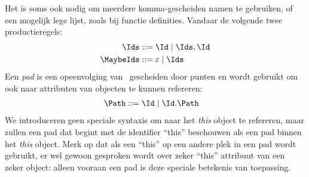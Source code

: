 Het is soms ook nodig om meerdere komma-gescheiden namen te gebruiken, of een mogelijk lege lijst, zoals bij functie definities. Vandaar de volgende twee productieregels:
%
\begin{align*}
  \Ids \GrammarDef \Id \mid \Ids, \Id \\
  \MaybeIds \GrammarDef \varepsilon \mid \Ids
\end{align*}
%
Een \emph{pad} is een opeenvolging van \Ids\ gescheiden door punten en wordt gebruikt om ook naar attributen van objecten te kunnen refereren:
%
\begin{align*}
  \Path \GrammarDef \Id \mid \Id . \Path
\end{align*}
%
We introduceren geen speciale syntaxis om naar het \emph{this} object te refereren, maar zullen een pad dat begint met de identifier “this” beschouwen als een pad binnen het \emph{this} object. Merk op dat als een “this” op een andere plek in een pad wordt gebruikt, er wel gewoon gesproken wordt over zeker “this” attribuut van een zeker object: alleen vooraan een pad is deze speciale betekenis van toepassing.

